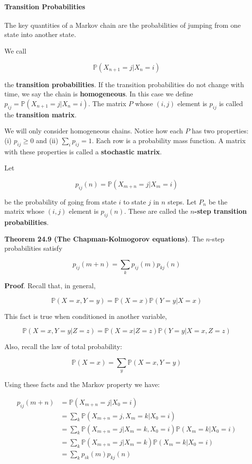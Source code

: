 \paragraph{Transition Probabilities}\label{transition-probabilities}

The key quantities of a Markov chain are the probabilities of jumping
from one state into another state.

We call

\[ \mathbb{P}(X_{n+1} = j | X_{n} = i) \]

the \textbf{transition probabilities}. If the transition probabilities
do not change with time, we say the chain is \textbf{homogeneous}. In
this case we define \(p_{ij} = \mathbb{P}(X_{n+1} = j | X_{n} = i)\). The
matrix \(P\) whose \((i, j)\) element is \(p_{ij}\) is called the
\textbf{transition matrix}.

We will only consider homogeneous chains. Notice how each \(P\) has two
properties: (i) \(p_{ij} \geq 0\) and (ii) \(\sum_{i} p_{ij} = 1\). Each
row is a probability mass function. A matrix with these properties is
called a \textbf{stochastic matrix}.

Let

\[ p_{ij}(n) = \mathbb{P}(X_{m + n} = j | X_{m} = i) \]

be the probability of going from state \(i\) to state \(j\) in \(n\)
steps. Let \(P_{n}\) be the matrix whose \((i, j)\) element is
\(p_{ij}(n)\). These are called the \textbf{\(n\)-step transition
probabilities}.

\textbf{Theorem 24.9 (The Chapman-Kolmogorov equations)}. The \(n\)-step
probabilities satisfy

\[ p_{ij}(m + n) = \sum_{k} p_{ij}(m) p_{kj}(n) \]

\textbf{Proof}. Recall that, in general,

\[ \mathbb{P}(X = x, Y = y) = \mathbb{P}(X = x) \mathbb{P}(Y = y | X = x) \]

This fact is true when conditioned in another variable,

\[ \mathbb{P}(X = x, Y = y | Z = z) = \mathbb{P}(X = x | Z = z) \mathbb{P}(Y = y | X = x, Z = z) \]

Also, recall the law of total probability:

\[ \mathbb{P}(X = x) = \sum_y \mathbb{P}(X = x, Y = y) \]

Using these facts and the Markov property we have:

\begin{align*}
p_{ij}(m + n) &= \mathbb{P}(X_{m + n} = j | X_{0} = i) \\
&= \sum_{k} \mathbb{P}(X_{m + n} = j, X_m = k | X_{0} = i) \\
&= \sum_{k} \mathbb{P}(X_{m + n} = j | X_m = k, X_{0} = i) \mathbb{P}(X_m = k | X_{0} = i) \\
&= \sum_{k} \mathbb{P}(X_{m + n} = j | X_m = k) \mathbb{P}(X_m = k | X_{0} = i) \\
&= \sum_{k} p_{ik}(m) p_{kj}(n)
\end{align*}

